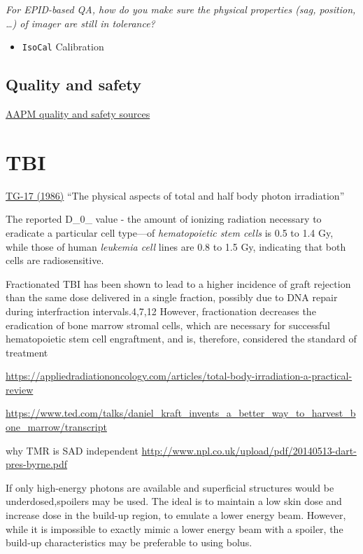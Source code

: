 \documentclass[]{book}
\providecommand{\tightlist}{%
  \setlength{\itemsep}{0pt}\setlength{\parskip}{0pt}}
\theoremstyle{definition}
\theoremstyle{definition}
\theoremstyle{definition}
\theoremstyle{remark}
\begin{document}
\emph{For EPID-based QA, how do you make sure the physical properties
(sag, position, \ldots{}) of imager are still in tolerance?}

\begin{itemize}
\tightlist
\item
  \texttt{IsoCal} Calibration
\end{itemize}

\section{Quality and safety}\label{quality-and-safety}

\href{https://www.aapm.org/QualitySafety/default.asp}{AAPM quality and
safety sources}

\chapter{TBI}\label{tbi}

\href{https://aapm.org/pubs/reports/RPT_17.pdf}{TG-17 (1986)} ``The
physical aspects of total and half body photon irradiation''

The reported D\_0\_ value - the amount of ionizing radiation necessary
to eradicate a particular cell type---of \emph{hematopoietic stem cells}
is 0.5 to 1.4 Gy, while those of human \emph{leukemia cell} lines are
0.8 to 1.5 Gy, indicating that both cells are radiosensitive.

Fractionated TBI has been shown to lead to a higher incidence of graft
rejection than the same dose delivered in a single fraction, possibly
due to DNA repair during interfraction intervals.4,7,12 However,
fractionation decreases the eradication of bone marrow stromal cells,
which are necessary for successful hematopoietic stem cell engraftment,
and is, therefore, considered the standard of treatment

\url{https://appliedradiationoncology.com/articles/total-body-irradiation-a-practical-review}

\url{https://www.ted.com/talks/daniel_kraft_invents_a_better_way_to_harvest_bone_marrow/transcript}

why TMR is SAD independent
\url{http://www.npl.co.uk/upload/pdf/20140513-dart-pres-byrne.pdf}

If only high-energy photons are available and superficial structures
would be underdosed,spoilers may be used. The ideal is to maintain a low
skin dose and increase dose in the build-up region, to emulate a lower
energy beam. However, while it is impossible to exactly mimic a lower
energy beam with a spoiler, the build-up characteristics may be
preferable to using bolus.
\end{document}
